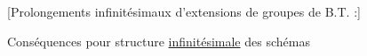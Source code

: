 
[Prolongements infinitésimaux d'extensions de groupes de B.T. :]

Conséquences pour structure \uline{infinitésimale} des schémas 

